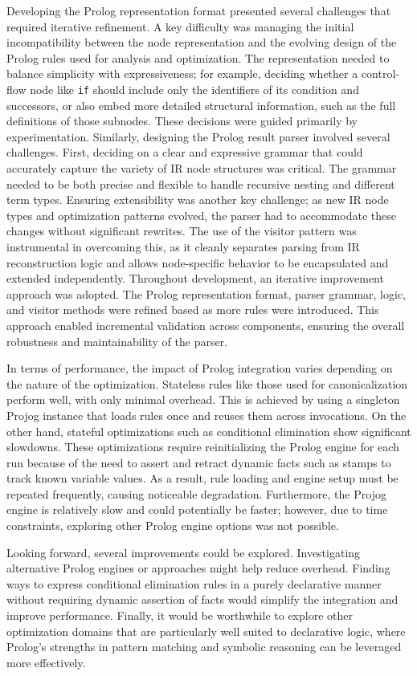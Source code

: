 Developing the Prolog representation format presented several challenges that required iterative refinement. A key difficulty was managing the initial incompatibility between the node representation and the evolving design of the Prolog rules used for analysis and optimization. The representation needed to balance simplicity with expressiveness; for example, deciding whether a control-flow node like \texttt{if} should include only the identifiers of its condition and successors, or also embed more detailed structural information, such as the full definitions of those subnodes. These decisions were guided primarily by experimentation. Similarly, designing the Prolog result parser involved several challenges. First, deciding on a clear and expressive grammar that could accurately capture the variety of IR node structures was critical. The grammar needed to be both precise and flexible to handle recursive nesting and different term types. Ensuring extensibility was another key challenge; as new IR node types and optimization patterns evolved, the parser had to accommodate these changes without significant rewrites. The use of the visitor pattern was instrumental in overcoming this, as it cleanly separates parsing from IR reconstruction logic and allows node-specific behavior to be encapsulated and extended independently. Throughout development, an iterative improvement approach was adopted. The Prolog representation format, parser grammar, logic, and visitor methods were refined based as more rules were introduced. This approach enabled incremental validation across components, ensuring the overall robustness and maintainability of the parser.

In terms of performance, the impact of Prolog integration varies depending on the nature of the optimization. Stateless rules like those used for canonicalization perform well, with only minimal overhead. This is achieved by using a singleton Projog instance that loads rules once and reuses them across invocations. On the other hand, stateful optimizations such as conditional elimination show significant slowdowns. These optimizations require reinitializing the Prolog engine for each run because of the need to assert and retract dynamic facts such as stamps to track known variable values. As a result, rule loading and engine setup must be repeated frequently, causing noticeable degradation. Furthermore, the Projog engine is relatively slow and could potentially be faster; however, due to time constraints, exploring other Prolog engine options was not possible.

Looking forward, several improvements could be explored. Investigating alternative Prolog engines or approaches might help reduce overhead. Finding ways to express conditional elimination rules in a purely declarative manner without requiring dynamic assertion of facts would simplify the integration and improve performance. Finally, it would be worthwhile to explore other optimization domains that are particularly well suited to declarative logic, where Prolog's strengths in pattern matching and symbolic reasoning can be leveraged more effectively.